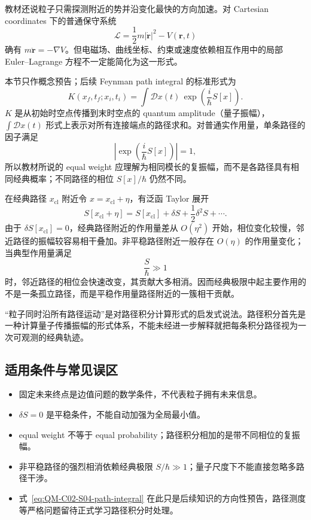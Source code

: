 教材还说粒子只需探测附近的势并沿变化最快的方向加速。对 Cartesian coordinates 下的普通保守系统
\[
  \mathcal L=\frac12m|\dot{\bm r}|^2-V(\bm r,t)
\]
确有 $m\ddot{\bm r}=-\nabla V$。但电磁场、曲线坐标、约束或速度依赖相互作用中的局部 Euler--Lagrange 方程不一定能简化为这一形式。


本节只作概念预告；后续 Feynman path integral 的标准形式为
\begin{equation}
  K(x_f,t_f;x_i,t_i)
  =\int\mathcal D x(t)\,
  \exp\left(\frac{i}{\hbar}S[x]\right).
  \label{eq:QM-C02-S04-path-integral}
\end{equation}
$K$ 是从初始时空点传播到末时空点的 quantum amplitude（量子振幅），$\int\mathcal D x(t)$ 形式上表示对所有连接端点的路径求和。对普通实作用量，单条路径的因子满足
\begin{equation}
  \left|
    \exp\left(\frac{i}{\hbar}S[x]\right)
  \right|=1,
  \label{eq:QM-C02-S04-equal-modulus}
\end{equation}
所以教材所说的 equal weight 应理解为相同模长的复振幅，而不是各路径具有相同经典概率；不同路径的相位 $S[x]/\hbar$ 仍然不同。

在经典路径 $x_{\mathrm{cl}}$ 附近令 $x=x_{\mathrm{cl}}+\eta$，有泛函 Taylor 展开
\begin{equation}
  S[x_{\mathrm{cl}}+\eta]
  =S[x_{\mathrm{cl}}]
  +\delta S
  +\frac12\delta^2S+\cdots.
  \label{eq:QM-C02-S04-action-expansion}
\end{equation}
由于 $\delta S[x_{\mathrm{cl}}]=0$，经典路径附近的作用量差从 $O(\eta^2)$ 开始，相位变化较慢，邻近路径的振幅较容易相干叠加。非平稳路径附近一般存在 $O(\eta)$ 的作用量变化；当典型作用量满足
\begin{equation}
  \frac{S}{\hbar}\gg1
  \label{eq:QM-C02-S04-classical-limit}
\end{equation}
时，邻近路径的相位会快速改变，其贡献大多相消。因而经典极限中起主要作用的不是一条孤立路径，而是平稳作用量路径附近的一簇相干贡献。

“粒子同时沿所有路径运动”是对路径积分计算形式的启发式说法。路径积分首先是一种计算量子传播振幅的形式体系，不能未经进一步解释就把每条积分路径视为一次可观测的经典轨迹。

\subsection{适用条件与常见误区}

\begin{itemize}[leftmargin=*]
  \item 固定未来终点是边值问题的数学条件，不代表粒子拥有未来信息。
  \item $\delta S=0$ 是平稳条件，不能自动加强为全局最小值。
  \item equal weight 不等于 equal probability；路径积分相加的是带不同相位的复振幅。
  \item 非平稳路径的强烈相消依赖经典极限 $S/\hbar\gg1$；量子尺度下不能直接忽略多路径干涉。
  \item 式~\eqref{eq:QM-C02-S04-path-integral} 在此只是后续知识的方向性预告，路径测度等严格问题留待正式学习路径积分时处理。
\end{itemize}

